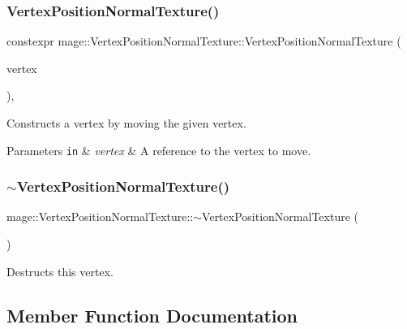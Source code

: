 \subsubsection{\texorpdfstring{Vertex\+Position\+Normal\+Texture()}{VertexPositionNormalTexture()}\hspace{0.1cm}{\footnotesize\ttfamily [4/4]}}
{\footnotesize\ttfamily constexpr mage\+::\+Vertex\+Position\+Normal\+Texture\+::\+Vertex\+Position\+Normal\+Texture (\begin{DoxyParamCaption}\item[{\hyperlink{structmage_1_1_vertex_position_normal_texture}{Vertex\+Position\+Normal\+Texture} \&\&}]{vertex }\end{DoxyParamCaption})\hspace{0.3cm}{\ttfamily [default]}, {\ttfamily [noexcept]}}

Constructs a vertex by moving the given vertex.


\begin{DoxyParams}[1]{Parameters}
\mbox{\tt in}  & {\em vertex} & A reference to the vertex to move. \\
\hline
\end{DoxyParams}
\hypertarget{structmage_1_1_vertex_position_normal_texture_a1dbfd9a6f88f075b59e56c353986b189}{}\label{structmage_1_1_vertex_position_normal_texture_a1dbfd9a6f88f075b59e56c353986b189} 
\subsubsection{\texorpdfstring{$\sim$\+Vertex\+Position\+Normal\+Texture()}{~VertexPositionNormalTexture()}}
{\footnotesize\ttfamily mage\+::\+Vertex\+Position\+Normal\+Texture\+::$\sim$\+Vertex\+Position\+Normal\+Texture (\begin{DoxyParamCaption}{ }\end{DoxyParamCaption})\hspace{0.3cm}{\ttfamily [default]}}

Destructs this vertex. 

\subsection{Member Function Documentation}
\hypertarget{structmage_1_1_vertex_position_normal_texture_a48598de027a1864b12857f537a2ac8fd}{}\label{structmage_1_1_vertex_position_normal_texture_a48598de027a1864b12857f537a2ac8fd} 
